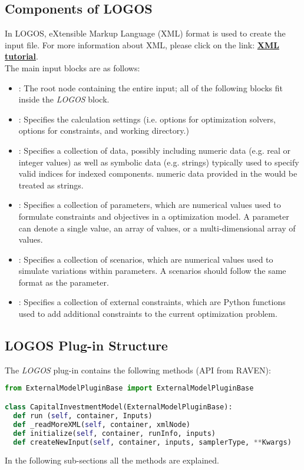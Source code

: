\subsection{Components of LOGOS}
In LOGOS, eXtensible Markup Language (XML) format is used to create the input file. For more
information about XML, please click on the link:
\href{https://www.w3schools.com/xml/default.asp}{\textbf{XML tutorial}}.
%
\\The main input blocks are as follows:
\begin{itemize}
  \item {}: The root node containing the
  entire input; all of
  the following blocks fit inside the \emph{LOGOS} block.
  \item {}: Specifies the calculation settings (i.e. options for
	optimization solvers, options for constraints, and working directory.)
  \item {}: Specifies a collection of data, possibly including
	numeric data (e.g. real or integer values) as well as symbolic data (e.g. strings)
	typically used to specify valid indices for indexed components.
	\nb numeric data provided in the  would be treated as strings.
	\item {}: Specifies a collection of parameters, which are
  numerical values used to formulate constraints and objectives in a
	optimization model. A parameter can denote a single value, an array of values, or a multi-dimensional
	array of values.
	\item {}: Specifies a collection of scenarios, which are
	numerical values used to simulate variations within parameters. A scenarios should follow
	the same format as the parameter.
	\item {}: Specifies a collection of external constraints, which are
  Python functions used to add additional constraints to the
	current optimization problem.
\end{itemize}

\subsection{LOGOS Plug-in Structure}
The  \textit{LOGOS} plug-in contains the following methods (API from RAVEN):

\begin{lstlisting}[language=python]
from ExternalModelPluginBase import ExternalModelPluginBase

class CapitalInvestmentModel(ExternalModelPluginBase):
  def run (self, container, Inputs)
  def _readMoreXML(self, container, xmlNode)
  def initialize(self, container, runInfo, inputs)
  def createNewInput(self, container, inputs, samplerType, **Kwargs)
\end{lstlisting}
In the following sub-sections all the methods are explained.
